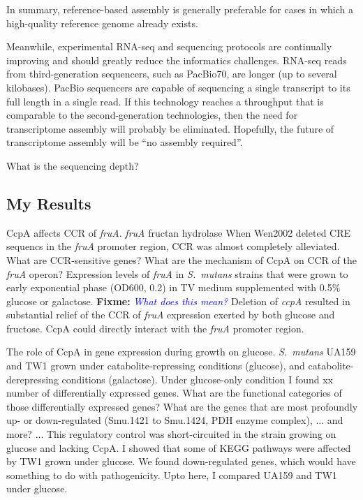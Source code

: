 \documentclass{article}
\newcommand{\fixme}[1]{{\textbf{Fixme:} \textit{\textcolor{blue}{#1}}}}
\begin{document}
In summary, reference-based assembly is generally preferable for cases in which
a high-quality reference genome already exists.

Meanwhile, experimental RNA-seq and sequencing protocols are continually
improving and should greatly reduce the informatics challenges.  RNA-seq reads
from third-generation sequencers, such as PacBio70, are longer (up to several
kilobases). PacBio sequencers are capable of sequencing a single transcript to
its full length in a single read. If this technology reaches a throughput that
is comparable to the second-generation technologies, then the need for
transcriptome assembly will probably be eliminated. Hopefully, the future of
transcriptome assembly will be ``no assembly required''.

What is the sequencing depth?

\subsection{My Results}

CcpA affects CCR of \textit{fruA}. 
\textit{fruA} fructan hydrolase
When Wen2002 deleted CRE sequencs in the \textit{fruA} promoter region, CCR was
almost completely alleviated. 
What are CCR-sensitive genes? 
What are the mechanism of CcpA on CCR of the \textit{fruA} operon? 
Expression levels of \textit{fruA} in \textit{S.\ mutans} strains that were
grown to early exponential phase (OD600, 0.2) in TV medium supplemented with
0.5\% glucose or galactose. \fixme{What does this mean?} 
Deletion of \textit{ccpA} resulted in substantial relief of the CCR of
\textit{fruA} expression exerted by both glucose and fructose. 
CcpA could directly interact with the \textit{fruA} promoter region. 

The role of CcpA in gene expression during growth on glucose. 
\textit{S.\ mutans} UA159 and TW1 grown under catabolite-repressing conditions
(glucose), and catabolite-derepressing conditions (galactose). Under
glucose-only condition I found xx number of differentially expressed genes. What
are the functional categories of those differentially expressed genes? What are
the genes that are most profoundly up- or down-regulated (Smu.1421 to Smu.1424,
PDH enzyme complex), ... and more? ... This regulatory control was
short-circuited in the strain growing on glucose and lacking CcpA. I showed that
some of KEGG pathways were affected by TW1 grown under glucose. We found
down-regulated genes, which would have something to do with pathogenicity. 
Upto here, I compared UA159 and TW1 under glucose.
\end{document}
